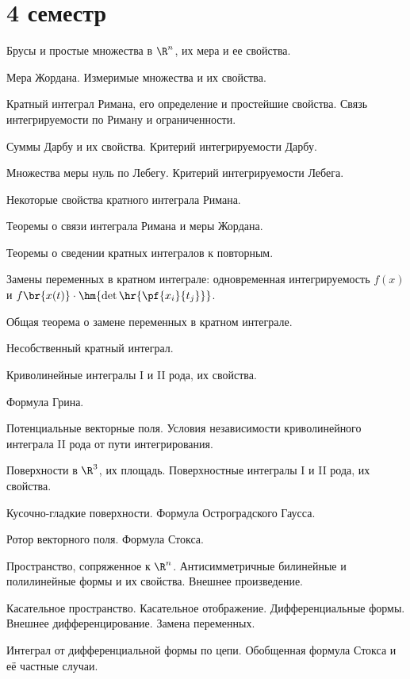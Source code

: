 \documentclass[a4paper]{article}
\begin{document}
\section*{4 семестр}

\begin{nums}{-2}
\item Брусы и простые множества в $\R^n$, их мера и ее свойства.
\item Мера Жордана. Измеримые множества и их свойства.
\item Кратный интеграл Римана, его определение и простейшие свойства. Связь интегрируемости по Риману и ограниченности.
\item Суммы Дарбу и их свойства. Критерий интегрируемости Дарбу.
\item Множества меры нуль по Лебегу. Критерий интегрируемости Лебега.
\item Некоторые свойства кратного интеграла Римана.
\item Теоремы о связи интеграла Римана и меры Жордана.
\item Теоремы о сведении кратных интегралов к повторным.
\item Замены переменных в кратном интеграле: одновременная интегрируемость
$f(x)$ и $f\br{x(t)} \cdot \hm{\det\hr{\pf{x_i}{t_j}}}$.
\item Общая теорема о замене переменных в кратном интеграле.
\item Несобственный кратный интеграл.
\item Криволинейные интегралы I и II рода, их свойства.
\item Формула Грина.
\item Потенциальные векторные поля. Условия независимости криволинейного интеграла II
рода от пути интегрирования.
\item Поверхности в $\R^3$, их площадь. Поверхностные интегралы I и II рода, их свойства.
\item Кусочно-гладкие поверхности. Формула Остроградского Гаусса.
\item Ротор векторного поля. Формула Стокса.
\item Пространство, сопряженное к $\R^n$. Антисимметричные билинейные и полилинейные формы
и их свойства. Внешнее произведение.
\item Касательное пространство. Касательное отображение. Дифференциальные формы.
Внешнее дифференцирование. Замена переменных.
\item Интеграл от дифференциальной формы по цепи. Обобщенная формула Стокса и её
частные случаи.
\end{nums}

\medskip\dmvntrail
\end{document}
